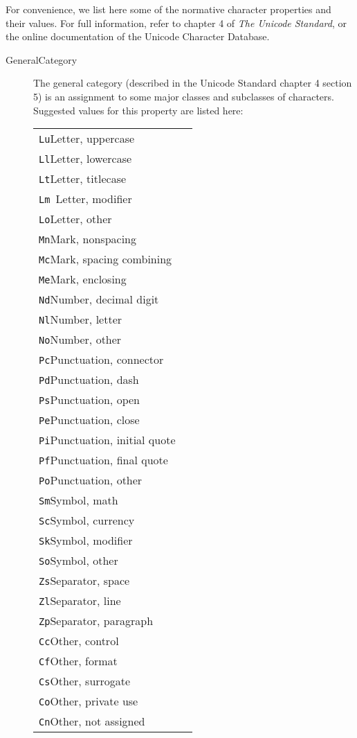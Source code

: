 For convenience, we list here some of the normative character properties and their values. For full information, refer to chapter 4 of \textit{The Unicode Standard}, or the online documentation of the Unicode Character Database. \begin{description}

\item[{General\textunderscore Category}]The general category (described in the Unicode Standard chapter 4 section 5) is an assignment to some major classes and subclasses of characters. Suggested values for this property are listed here:  \par 
\begin{longtable}{P{0.3337485172004745\textwidth}P{0.5162514827995255\textwidth}}
\texttt{Lu}\tabcellsep Letter, uppercase\\
\texttt{Ll}\tabcellsep Letter, lowercase\\
\texttt{Lt}\tabcellsep Letter, titlecase\\
\texttt{Lm }\tabcellsep Letter, modifier\\
\texttt{Lo}\tabcellsep Letter, other\\
\texttt{Mn}\tabcellsep Mark, nonspacing\\
\texttt{Mc}\tabcellsep Mark, spacing combining\\
\texttt{Me}\tabcellsep Mark, enclosing\\
\texttt{Nd}\tabcellsep Number, decimal digit\\
\texttt{Nl}\tabcellsep Number, letter\\
\texttt{No}\tabcellsep Number, other\\
\texttt{Pc}\tabcellsep Punctuation, connector\\
\texttt{Pd}\tabcellsep Punctuation, dash\\
\texttt{Ps}\tabcellsep Punctuation, open\\
\texttt{Pe}\tabcellsep Punctuation, close\\
\texttt{Pi}\tabcellsep Punctuation, initial quote\\
\texttt{Pf}\tabcellsep Punctuation, final quote\\
\texttt{Po}\tabcellsep Punctuation, other\\
\texttt{Sm}\tabcellsep Symbol, math\\
\texttt{Sc}\tabcellsep Symbol, currency\\
\texttt{Sk}\tabcellsep Symbol, modifier\\
\texttt{So}\tabcellsep Symbol, other\\
\texttt{Zs}\tabcellsep Separator, space\\
\texttt{Zl}\tabcellsep Separator, line\\
\texttt{Zp}\tabcellsep Separator, paragraph\\
\texttt{Cc}\tabcellsep Other, control\\
\texttt{Cf}\tabcellsep Other, format\\
\texttt{Cs}\tabcellsep Other, surrogate\\
\texttt{Co}\tabcellsep Other, private use\\
\texttt{Cn}\tabcellsep Other, not assigned\end{longtable} \par
 

\end{description}
